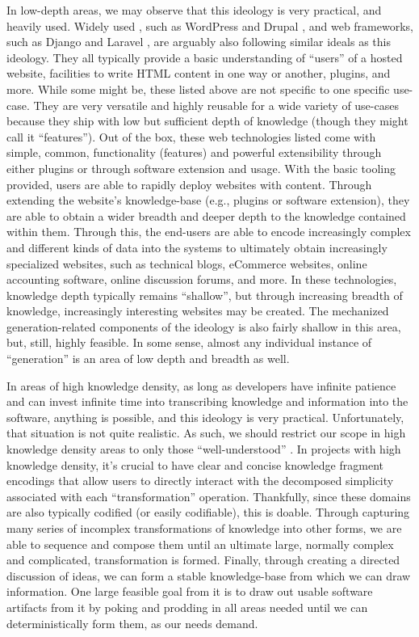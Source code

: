 In low-depth areas, we may observe that this ideology is very practical, and
heavily used. Widely used , such as WordPress \cite{WordPress} and
Drupal \cite{Drupal}, and web frameworks, such as Django \cite{Django} and
Laravel \cite{Laravel}, are arguably also following similar ideals as this
ideology. They all typically provide a basic understanding of ``users'' of a
hosted website, facilities to write HTML content in one way or another, plugins,
and more. While some might be, these listed above are not specific to one
specific use-case. They are very versatile and highly reusable for a wide
variety of use-cases because they ship with low but sufficient depth of
knowledge (though they might call it ``features''). Out of the box, these web
technologies listed come with simple, common, functionality (features) and
powerful extensibility through either plugins or through software extension and
usage. With the basic tooling provided, users are able to rapidly deploy
websites with content. Through extending the website's knowledge-base (e.g.,
plugins or software extension), they are able to obtain a wider breadth and
deeper depth to the knowledge contained within them. Through this, the end-users
are able to encode increasingly complex and different kinds of data into the
systems to ultimately obtain increasingly specialized websites, such as
technical blogs, eCommerce websites, online accounting software, online
discussion forums, and more. In these technologies, knowledge depth typically
remains ``shallow'', but through increasing breadth of knowledge, increasingly
interesting websites may be created. The mechanized generation-related
components of the ideology is also fairly shallow in this area, but, still,
highly feasible. In some sense, almost any individual instance of ``generation''
is an area of low depth and breadth as well.

In areas of high knowledge density, as long as developers have infinite patience
and can invest infinite time into transcribing knowledge and information into
the software, anything is possible, and this ideology is very practical.
Unfortunately, that situation is not quite realistic. As such, we should
restrict our scope in high knowledge density areas to only those
``well-understood'' \cite{well-understood}. In projects with high knowledge
density, it's crucial to have clear and concise knowledge fragment encodings
that allow users to directly interact with the decomposed simplicity associated
with each ``transformation'' operation. Thankfully, since these domains are also
typically codified (or easily codifiable), this is doable. Through capturing
many series of incomplex transformations of knowledge into other forms, we are
able to sequence and compose them until an ultimate large, normally complex and
complicated, transformation is formed. Finally, through creating a directed
discussion of ideas, we can form a stable knowledge-base from which we can draw
information. One large feasible goal from it is to draw out usable software
artifacts from it by poking and prodding in all areas needed until we can
deterministically form them, as our needs demand.


